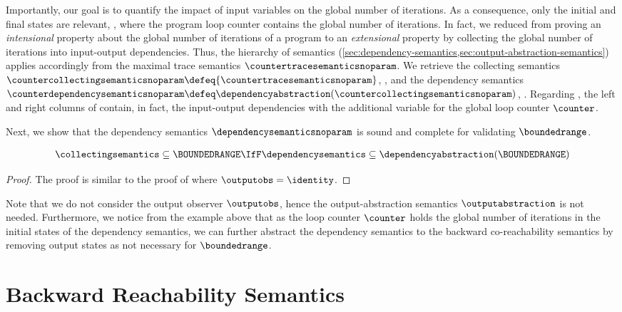 Importantly, our goal is to quantify the impact of input variables on the global number of iterations.
As a consequence, only the initial and final states are relevant, \ie, where the program loop counter contains the global number of iterations.
In fact, we reduced from proving an \emph{intensional} property about the global number of iterations of a program to an \emph{extensional} property by collecting the global number of iterations into input-output dependencies.
Thus, the hierarchy of semantics (\cref{sec:dependency-semantics,sec:output-abstraction-semantics}) applies accordingly from the maximal trace semantics $\countertracesemanticsnoparam$.
We retrieve the collecting semantics $\countercollectingsemanticsnoparam \defeq \{ \countertracesemanticsnoparam \}$, \cf{} , and the dependency semantics $\counterdependencysemanticsnoparam \defeq \dependencyabstraction(\countercollectingsemanticsnoparam)$, \cf{} .
Regarding , the left and right columns of  contain, in fact, the input-output dependencies with the additional variable for the global loop counter $\counter$.


Next, we show that the dependency semantics $\dependencysemanticsnoparam$ is sound and complete for validating $\boundedrange$.
\begin{lemma}
  \begin{align*}
    \collectingsemantics \subseteq \BOUNDEDRANGE \IfF \dependencysemantics \subseteq \dependencyabstraction(\BOUNDEDRANGE)
  \end{align*}
\end{lemma}
\begin{proof}
  The proof is similar to the proof of  where $\outputobs = \identity$.
\end{proof}

Note that we do not consider the output observer $\outputobs$, hence the output-abstraction semantics $\outputabstraction$ is not needed.
Furthermore, we notice from the example above that as the loop counter $\counter$ holds the global number of iterations in the initial states of the dependency semantics, we can further abstract the dependency semantics to the backward co-reachability semantics by removing output states as not necessary for $\boundedrange$.


\section{Backward Reachability Semantics}

